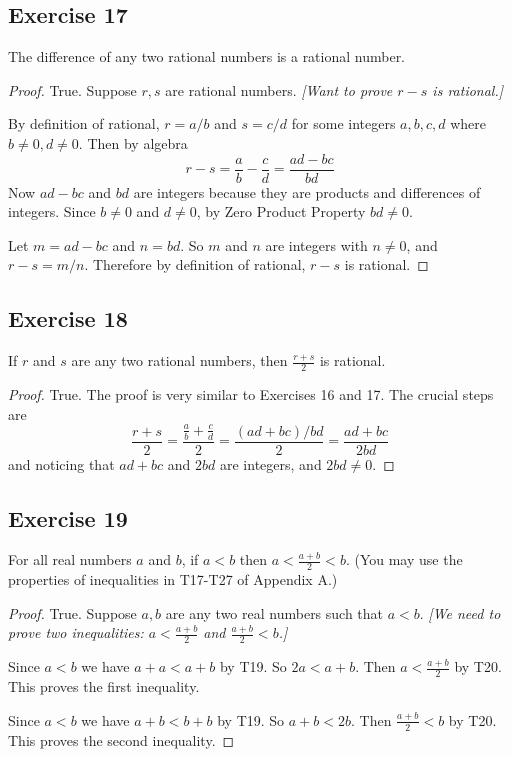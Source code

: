 \documentclass[14pt]{extarticle}
\begin{document}
\subsection{Exercise 17}
The difference of any two rational numbers is a rational number.

\begin{proof}
    True. Suppose $r,s$ are rational numbers. {\it[Want to prove $r-s$ is rational.]}

    By definition of rational, $r = a/b$ and $s = c/d$ for some integers $a,b,c,d$ where $b \neq 0, d \neq 0$. Then by algebra
    \[
        r-s = \frac{a}{b}-\frac{c}{d} = \frac{ad-bc}{bd}
    \]
    Now $ad-bc$ and $bd$ are integers because they are products and differences of integers. Since $b \neq 0$ and $d \neq 0$, by Zero Product Property $bd \neq 0$.

    Let $m = ad-bc$ and $n = bd$. So $m$ and $n$ are integers with $n \neq 0$, and $r - s = m / n$. Therefore by definition of rational, $r-s$ is rational.
\end{proof}

\subsection{Exercise 18}
If $r$ and $s$ are any two rational numbers, then $\frac{r+s}{2}$ is rational.

\begin{proof}
    True. The proof is very similar to Exercises 16 and 17. The crucial steps are
    \[
        \frac{r+s}{2} = \frac{\frac{a}{b} + \frac{c}{d}}{2} = \frac{(ad+bc)/bd}{2} = \frac{ad+bc}{2bd}
    \]
    and noticing that $ad+bc$ and $2bd$ are integers, and $2bd \neq 0$.
\end{proof}

\subsection{Exercise 19}
For all real numbers $a$ and $b$, if $a < b$ then $a < \frac{a+b}{2} < b$. (You may use the properties of inequalities in T17-T27 of Appendix A.)

\begin{proof}
    True. Suppose $a,b$ are any two real numbers such that $a<b$. {\it[We need to prove two inequalities: $a < \frac{a+b}{2}$ and $\frac{a+b}{2} < b$.]}

    Since $a<b$ we have $a+a < a+b$ by T19. So $2a < a+b$. Then $a < \frac{a+b}{2}$ by T20. This proves the first inequality.

    Since $a<b$ we have $a+b < b+b$ by T19. So $a+b < 2b$. Then $\frac{a+b}{2} < b$ by T20. This proves the second inequality.
\end{proof}
\end{document}
